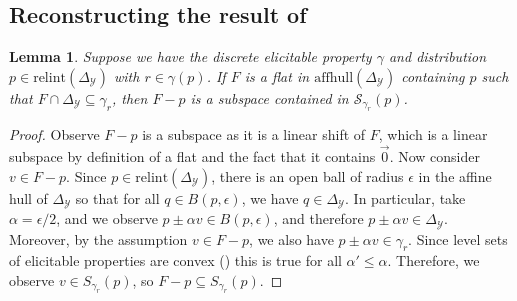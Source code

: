 \documentclass{article}
\newcommand{\Comments}{1}
\newcommand{\mynote}[2]{\ifnum\Comments=1\textcolor{#1}{#2}\fi}
\newcommand{\raf}[1]{\mynote{green!80!blue}{[RF: #1]}}
\newcommand{\simplex}{\Delta_\Y}
\newcommand{\relint}[1]{\mathrm{relint}(#1)}
\newcommand{\affhull}{\mathrm{affhull}}
\newcommand{\Sc}{\mathcal{S}}  %
\newcommand{\Y}{\mathcal{Y}}
\newtheorem{lemma}{Lemma}
\begin{document}
\subsection{Reconstructing the result of~\citet[Theorem 16]{ramaswamy2016convex}}
\begin{lemma}\label{lem:feas-sub-is-a-flat}
	Suppose we have the discrete elicitable property $\gamma$ and distribution $p \in \relint{\simplex}$ with $r \in \gamma(p)$.
	If $F$ is a flat in $\affhull(\simplex)$ containing $p$ such that $F \cap \simplex \subseteq \gamma_r$, then $F - p$ is a subspace contained in $\Sc_{\gamma_r}(p)$.
\end{lemma}
\begin{proof}
	Observe $F-p$ is a subspace as it is a linear shift of $F$, which is a linear subspace by definition of a flat and the fact that it contains $\vec 0$.
	Now consider $v \in F - p$.
	Since $p \in \relint{\simplex}$, there is an open ball of radius $\epsilon$ in the affine hull of $\simplex$ so that for all $q \in B(p, \epsilon)$, we have $q \in \simplex$.
	In particular, take $\alpha = \epsilon / 2$, and we observe $p \pm \alpha v \in B(p, \epsilon)$, and therefore $p \pm \alpha v \in \simplex$.
	Moreover, by the assumption $v \in F - p$, we also have $p \pm \alpha v \in \gamma_r$. 
	Since level sets of elicitable properties are convex (\citep{lambert2009eliciting}) this is true for all $\alpha' \leq \alpha$.
	Therefore, we observe $v \in S_{\gamma_r}(p)$, so $F-p \subseteq S_{\gamma_r}(p)$.
\end{proof}
\end{document}
